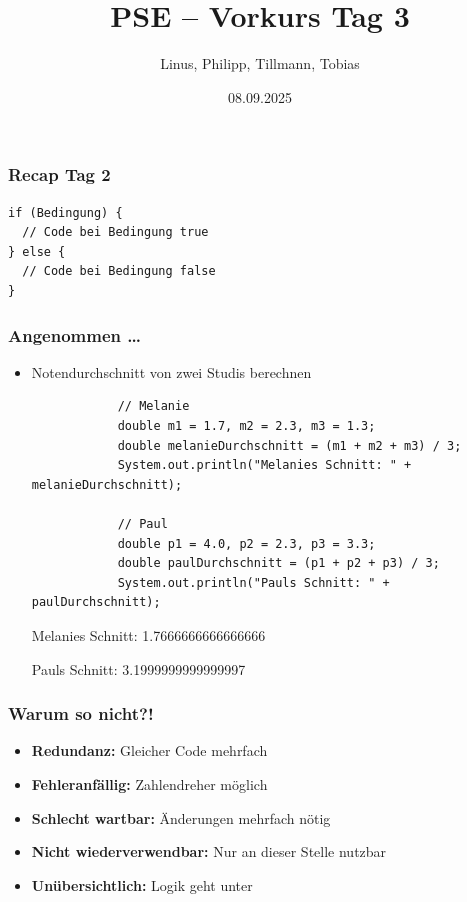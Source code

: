 \documentclass{../../presentation}
\title{PSE – Vorkurs Tag 3}
\author{Linus, Philipp, Tillmann, Tobias}
\institute{FIUS - Fachgruppe Informatik Universität Stuttgart}
\date{08.09.2025}
\begin{document}
\begin{frame}
	\titlepage
\end{frame}

\begin{frame}
	\listoftodos
\end{frame}

\begin{frame}
	\frametitle{Recap Tag 2}
	\begin{verbatim}
if (Bedingung) {
  // Code bei Bedingung true
} else {
  // Code bei Bedingung false
}
\end{verbatim}
\end{frame}

\begin{frame}[fragile]
	\frametitle{Angenommen \dots}
	\begin{itemize}
		\item\pause Notendurchschnitt von zwei Studis berechnen
		      \begin{verbatim}
            // Melanie
            double m1 = 1.7, m2 = 2.3, m3 = 1.3;
            double melanieDurchschnitt = (m1 + m2 + m3) / 3;
            System.out.println("Melanies Schnitt: " + melanieDurchschnitt);

            // Paul
            double p1 = 4.0, p2 = 2.3, p3 = 3.3;
            double paulDurchschnitt = (p1 + p2 + p3) / 3;
            System.out.println("Pauls Schnitt: " + paulDurchschnitt);
        \end{verbatim}
		      \begin{ausgabe}
			      Melanies Schnitt: 1.7666666666666666

			      Pauls Schnitt: 3.1999999999999997
		      \end{ausgabe}
	\end{itemize}
\end{frame}

\begin{frame}[fragile]
	\frametitle{Warum so nicht?!}
	\begin{itemize}
		\item\pause \textbf{Redundanz:} Gleicher Code mehrfach
		\item\pause \textbf{Fehleranfällig:} Zahlendreher möglich
		\item\pause \textbf{Schlecht wartbar:} Änderungen mehrfach nötig
		\item\pause \textbf{Nicht wiederverwendbar:} Nur an dieser Stelle nutzbar
		\item\pause \textbf{Unübersichtlich:} Logik geht unter
	\end{itemize}
	\vspace{2em}
	\begin{minipage}{\textwidth}
		\centering
		\onslide\pause{\Huge $\rightarrow$~}%
	\end{minipage}
\end{frame}
\end{document}
